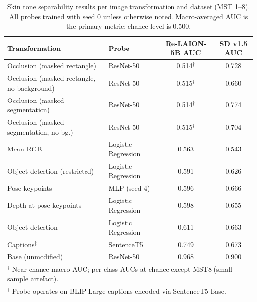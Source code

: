 \begin{table}[htbp]
	\centering
	\caption{Skin tone separability results per image transformation and dataset
		(MST 1--8). All probes trained with seed 0 unless otherwise noted.
		Macro-averaged AUC is the primary metric; chance level is 0.500.}
	\label{tab:skintone_separability_overall}
	\small
	\begin{tabular}{llcc}
		\toprule
		\textbf{Transformation} & \textbf{Probe} &
		\textbf{Re-LAION-5B AUC} & \textbf{SD v1.5 AUC} \\
		\midrule
		Occlusion (masked rectangle)                & ResNet-50           & 0.514$^\dagger$ & 0.728 \\
		Occlusion (masked rectangle, no background) & ResNet-50           & 0.515$^\dagger$ & 0.660 \\
		Occlusion (masked segmentation)             & ResNet-50           & 0.514$^\dagger$ & 0.774 \\
		Occlusion (masked segmentation, no bg.)     & ResNet-50           & 0.515$^\dagger$ & 0.704 \\
		Mean RGB                                    & Logistic Regression & 0.563           & 0.543 \\
		Object detection (restricted)               & Logistic Regression & 0.591           & 0.626 \\
		Pose keypoints                              & MLP (seed 4)        & 0.596           & 0.666 \\
		Depth at pose keypoints                     & Logistic Regression & 0.598           & 0.655 \\
		Object detection                            & Logistic Regression & 0.611           & 0.663 \\
		Captions$^\ddagger$                         & SentenceT5          & 0.749           & 0.673 \\
		Base (unmodified)                           & ResNet-50           & 0.968           & 0.900 \\
		\bottomrule
		\multicolumn{4}{l}{\footnotesize $^\dagger$ Near-chance macro AUC; per-class AUCs at chance except MST8 (small-sample artefact).} \\
		\multicolumn{4}{l}{\footnotesize $^\ddagger$ Probe operates on BLIP Large captions encoded via SentenceT5-Base.} \\
	\end{tabular}
\end{table}

